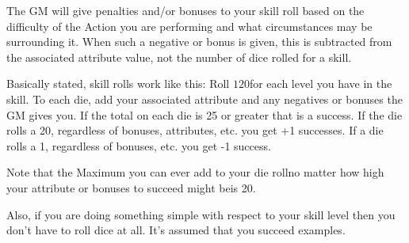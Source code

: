 \documentclass[twoside]{book}
\begin{document}
    {  
    The GM will give penalties and/or bonuses to your
               skill roll based on the difficulty of the Action you are
               performing and what circumstances may be surrounding it.
               When such a negative or bonus is given, this is subtracted
               from the associated attribute value, not the number of
               dice rolled for a skill. 
    }
  
    {  
    Basically stated, skill rolls work like this: Roll
               \ensuremath{1}\ensuremath{20}\ensuremath{}for each level you have in the skill. To each die,
               add your associated attribute and any negatives or bonuses
               the GM gives you. If the total on each die is 25 or
               greater that is a success. If the die rolls a 20,
               regardless of bonuses, attributes, etc. you get +1
               successes. If a die rolls a 1, regardless of bonuses, etc.
               you get -1 success. 
    }
  
    {  
    Note that the Maximum you can ever add to your die
               rollno matter how high your attribute or bonuses to
               succeed might beis 20. 
    }
  
    {  
    Also, if you are doing something simple with respect
               to your skill level then you don't have to roll dice
               at all. It's assumed that you succeed examples.
               
    }
  
  

  

  
  

  
\end{document}
